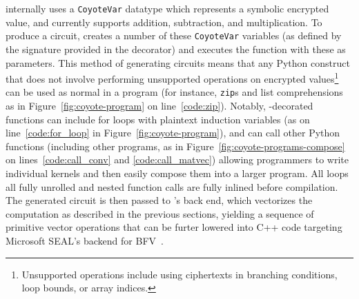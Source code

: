 \system internally uses a \texttt{CoyoteVar} datatype which represents a symbolic encrypted value, and currently supports addition, subtraction, and multiplication.
To produce a circuit, \system creates a number of these \texttt{CoyoteVar} variables (as defined by the signature provided in the decorator) and executes the function with these as parameters.
This method of generating circuits means that any Python construct that does not involve performing unsupported operations on encrypted values\footnote{Unsupported operations include using ciphertexts in branching conditions, loop bounds, or array indices.} can be used as normal in a \system program (for instance, \texttt{zip}s and list comprehensions as in Figure~\ref{fig:coyote-program} on line~\ref{code:zip}).
Notably, \system-decorated functions can include for loops with plaintext induction variables (as on line~\ref{code:for_loop} in Figure~\ref{fig:coyote-program}), and can call other Python functions (including other \system programs, as in Figure~\ref{fig:coyote-programs-compose} on lines~\ref{code:call_conv} and \ref{code:call_matvec}) allowing programmers to write individual kernels and then easily compose them into a larger program.
All loops all fully unrolled and nested function calls are fully inlined before compilation.
The generated circuit is then passed to \system's back end, which vectorizes the computation as described in the previous sections, yielding a sequence of primitive vector operations that can be furter lowered into C++ code targeting Microsoft SEAL's backend for BFV~\cite{seal}.





